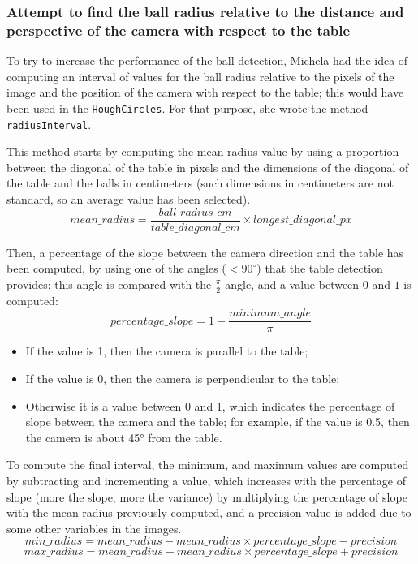 \subsubsection{Attempt to find the ball radius relative to the distance and perspective of the camera with respect to the table}
To try to increase the performance of the ball detection, Michela had the idea of computing an interval of values for the ball radius relative to the pixels of the image and the position of the camera with respect to the table; this would have been used in the \texttt{HoughCircles}.
For that purpose, she wrote the method \texttt{radiusInterval}.

This method starts by computing the mean radius value by using a proportion between the diagonal of the table in pixels and the dimensions of the diagonal of the table and the balls in centimeters (such dimensions in centimeters are not standard, so an average value has been selected).
\begin{equation}
	mean\_radius = \frac{ball\_radius\_cm}{table\_diagonal\_cm} \times longest\_diagonal\_px
\end{equation}

Then, a percentage of the slope between the camera direction and the table has been computed, by using one of the angles ($<90^{\circ}$) that the table detection provides; this angle is compared with the $\frac{\pi}{2}$ angle, and a value between $0$ and $1$ is computed:
\begin{equation}
	percentage\_slope = 1 - \frac{minimum\_angle}{\pi}
\end{equation}

\begin{itemize}
	\item If the value is 1, then the camera is parallel to the table;
	\item If the value is 0, then the camera is perpendicular to the table;
	\item Otherwise it is a value between 0 and 1, which indicates the percentage of slope between the camera and the table; for example, if the value is 0.5, then the camera is about 45° from the table.
\end{itemize}

To compute the final interval, the minimum, and maximum values are computed by subtracting and incrementing a value, which increases with the percentage of slope (more the slope, more the variance) by multiplying the percentage of slope with the mean radius previously computed, and a precision value is added due to some other variables in the images.
\begin{equation}
	min\_radius = mean\_radius - mean\_radius \times percentage\_slope - precision
\end{equation}
\begin{equation}
	max\_radius = mean\_radius + mean\_radius \times percentage\_slope + precision
\end{equation}
